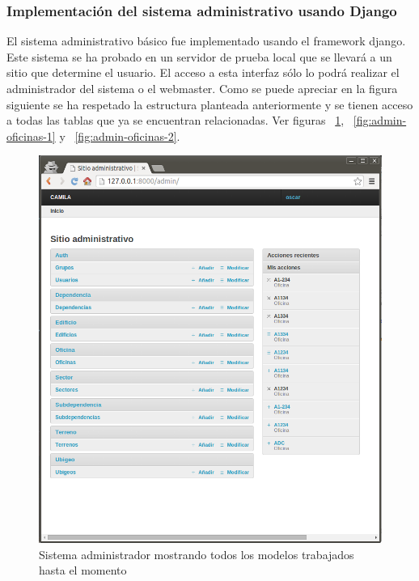 \subsubsection{Implementación del sistema administrativo usando Django}

El sistema administrativo básico fue implementado usando el framework django. Este sistema se ha probado en un servidor de prueba local que se llevará a un sitio que determine el usuario. El acceso a esta interfaz sólo lo podrá realizar el administrador del sistema o el webmaster. Como se puede apreciar en la figura siguiente se ha respetado la estructura planteada anteriormente y se tienen acceso a todas las tablas que ya se encuentran relacionadas. Ver figuras ~\ref{fig:admin}, ~\ref{fig:admin-oficinas-1} y ~\ref{fig:admin-oficinas-2}.

\begin{figure}[h!]
  \centering
  \includegraphics[scale=0.4]{images/activities/camila/admin.png}
  \caption{Sistema administrador mostrando todos los modelos trabajados hasta el momento}
  \label{fig:admin}
\end{figure}

